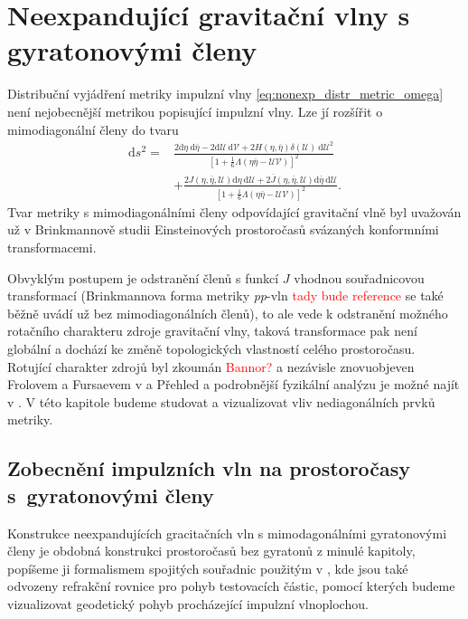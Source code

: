 \chapter{Neexpandující gravitační vlny s gyratonovými členy}
\label{chap:kap03}
Distribuční vyjádření metriky impulzní vlny \eqref{eq:nonexp_distr_metric_omega} není nejobecnější metrikou popisující
impulzní vlny. Lze jí rozšířit o mimodiagonální členy do tvaru
\begin{equation}
    \label{eq:nonexp_gyra_distrib_metric_omega}
    \begin{split}
        \mathrm{d}s^2=&\frac{2\mathrm{d}\eta~\mathrm{d}\bar{\eta} - 2 \mathrm{d}\mathcal{U}~\mathrm{d}\mathcal{V} + 2H(\eta, \bar{\eta}) \delta(\mathcal{U}) 
        ~\mathrm{d}\mathcal{U}^2}{\left[1+\frac{1}{6}\Lambda(\eta \bar{\eta}-\mathcal{U}\mathcal{V})\right]^2} \\
        &+ \frac{2J\left(\eta, \bar{\eta}, \mathcal{U}\right) \mathrm{d}\eta~\mathrm{d}\mathcal{U}
        +2\overline{J}\left(\eta, \bar{\eta}, \mathcal{U}\right) \mathrm{d}\bar{\eta}~\mathrm{d}\mathcal{U}}{\left[1+\frac{1}{6}\Lambda(\eta \bar{\eta}-\mathcal{U}\mathcal{V})\right]^2}.
    \end{split}
\end{equation}
Tvar metriky s mimodiagonálními členy odpovídající gravitační vlně byl uvažován už v Brinkmannově studii \cite{Brinkmann1925} Einsteinových prostoročasů svázaných konformními transformacemi.

Obvyklým postupem je odstranění členů s funkcí $J$ vhodnou souřadnicovou transformací (Brinkmannova forma metriky \emph{pp}-vln \textcolor{red}{tady bude reference} se také běžně uvádí už bez mimodiagonálních členů), to ale vede k odstranění
možného rotačního charakteru zdroje gravitační vlny, taková transformace pak není globální a dochází ke změně topologických vlastností celého prostoročasu.
Rotující charakter zdrojů byl zkoumán \textcolor{red}{Bannor?} a nezávisle znovuobjeven Frolovem a Fursaevem v \cite{Frolov2005_0} a \cite{Frolov2005} Přehled a podrobnější
fyzikální analýzu je možné najít v \cite{Podolsky2014}.
V této kapitole budeme studovat a vizualizovat vliv nediagonálních prvků metriky.

\section{Zobecnění impulzních vln na prostoročasy s~gyratonovými členy}
Konstrukce neexpandujících gracitačních vln s mimodagonálními gyratonovými členy je obdobná konstrukci prostoročasů bez gyratonů z minulé kapitoly, popíšeme ji formalismem spojitých souřadnic
použitým v \cite{Podolsky_2017}, kde jsou také odvozeny refrakční rovnice pro pohyb testovacích částic, pomocí kterých budeme vizualizovat geodetický pohyb procházející impulzní vlnoplochou.


